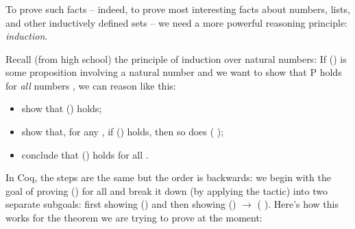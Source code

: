 \documentclass[12pt]{report}
\begin{document}
\subsubsection{ }



 To prove such facts -- indeed, to prove most interesting
    facts about numbers, lists, and other inductively defined sets --
    we need a more powerful reasoning principle: \textit{induction}.


    Recall (from high school) the principle of induction over natural
    numbers: If () is some proposition involving a natural number
     and we want to show that P holds for \textit{all} numbers , we can
    reason like this:



\begin{itemize}
\item  show that () holds;

\item  show that, for any , if () holds, then so does
           ( );

\item  conclude that () holds for all .

\end{itemize}


    In Coq, the steps are the same but the order is backwards: we
    begin with the goal of proving () for all  and break it
    down (by applying the  tactic) into two separate
    subgoals: first showing () and then showing () \ensuremath{\rightarrow} (
    ).  Here's how this works for the theorem we are trying to
    prove at the moment: 

\subsubsection{ }
\end{document}
